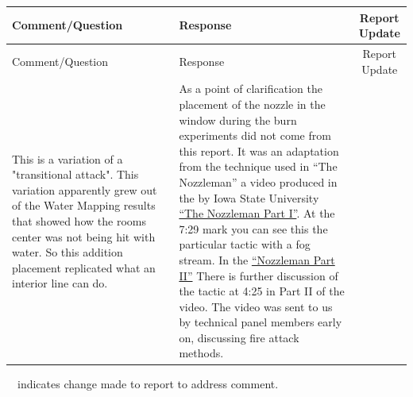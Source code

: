\documentclass[12pt,oneside]{book}
\begin{document}
\begin{landscape}
\begin{longtable}{|L{4in}|L{3.75in}|c|}
		\hline
		Comment/Question & Response & Report Update \\ 
		\toprule[1.0pt] \endfirsthead
		\hline
		Comment/Question & Response & Report Update \\ 
		\toprule[1.0pt] \endhead
		\hline
		This is a variation of a "transitional attack". This variation apparently grew out of the Water Mapping results that showed how the rooms center was not being hit with water. So this addition placement replicated what an interior line can do. &
		As a point of clarification the placement of the nozzle in the window during the burn experiments did not come from this report. It was an adaptation from the technique used in ``The Nozzleman'' a video produced in the by Iowa State University \href{https://www.youtube.com/watch?v=cBd9i2bQmaQ&t=449}{``The Nozzleman Part I''}. At the 7:29 mark you can see this the particular tactic with a fog stream. In the \href{https://www.youtube.com/watch?v=hbMWNf9Eq7c&t=265s}{``Nozzleman Part II''} There is further discussion of the tactic at 4:25 in Part II of the video. The video was sent to us by technical panel members early on, discussing fire attack methods. & \\
		\hline

\end{longtable}
\checkmark~~indicates change made to report to address comment.

\end{landscape}

\pagestyle{plain}



\newpage
\end{document}
